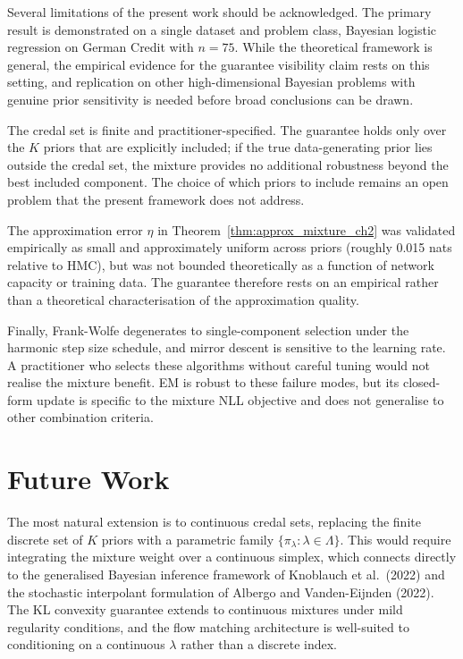 Several limitations of the present 
work should be acknowledged. The 
primary result is demonstrated on a 
single dataset and problem class, 
Bayesian logistic regression on German 
Credit with $n = 75$. While the 
theoretical framework is general, the 
empirical evidence for the guarantee 
visibility claim rests on this setting, 
and replication on other high-dimensional 
Bayesian problems with genuine prior 
sensitivity is needed before broad 
conclusions can be drawn.

The credal set is finite and 
practitioner-specified. The guarantee 
holds only over the $K$ priors that 
are explicitly included; if the true 
data-generating prior lies outside the 
credal set, the mixture provides no 
additional robustness beyond the best 
included component. The choice of 
which priors to include remains an 
open problem that the present framework 
does not address.

The approximation error $\eta$ in 
Theorem~\ref{thm:approx_mixture_ch2} 
was validated empirically as small 
and approximately uniform across priors 
(roughly 0.015 nats relative to HMC), 
but was not bounded theoretically as 
a function of network capacity or 
training data. The guarantee therefore 
rests on an empirical rather than a 
theoretical characterisation of the 
approximation quality.

Finally, Frank-Wolfe degenerates to 
single-component selection under the 
harmonic step size schedule, and 
mirror descent is sensitive to the 
learning rate. A practitioner who 
selects these algorithms without 
careful tuning would not realise the 
mixture benefit. EM is robust to 
these failure modes, but its 
closed-form update is specific to 
the mixture NLL objective and does 
not generalise to other combination 
criteria.

\section{Future Work}

The most natural extension is to 
continuous credal sets, replacing 
the finite discrete set of $K$ priors 
with a parametric family 
$\{\pi_\lambda : \lambda \in \Lambda\}$. 
This would require integrating the 
mixture weight over a continuous 
simplex, which connects directly to 
the generalised Bayesian inference 
framework of Knoblauch et al.\ (2022) 
and the stochastic interpolant 
formulation of Albergo and 
Vanden-Eijnden (2022). The KL 
convexity guarantee extends to 
continuous mixtures under mild 
regularity conditions, and the 
flow matching architecture is 
well-suited to conditioning on a 
continuous $\lambda$ rather than a 
discrete index.

